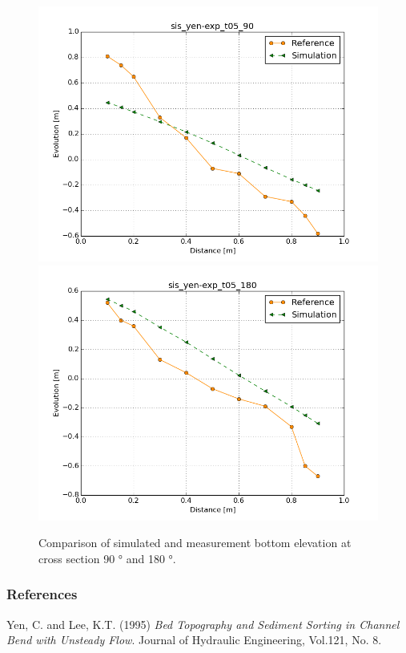 \begin{figure} [!h]
\centering
\includegraphics[scale=0.5, bb=0 0 30 30]{img/sis_yen-exp_90.png}
\includegraphics[scale=0.5, bb=0 0 30 30]{img/sis_yen-exp_180.png}
 \caption{Comparison of simulated and measurement bottom elevation at cross section 90 ° and 180 °.}\label{fig:results2}
\end{figure}



\subsubsection{References}
%
Yen, C. and Lee, K.T. (1995) \textit{ Bed Topography and Sediment Sorting in Channel Bend 
with Unsteady Flow}. Journal of Hydraulic Engineering, Vol.121, No. 8.
